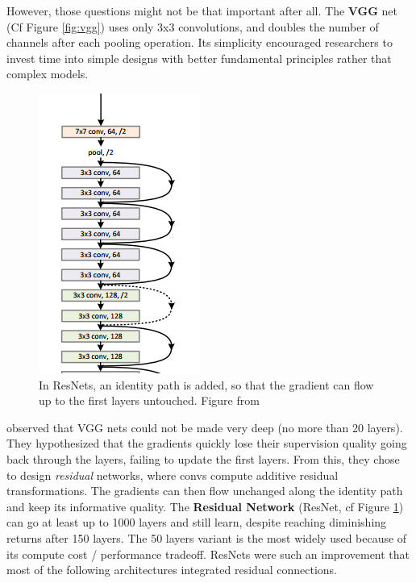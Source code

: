 However, those questions might not be that important after all. The \textbf{VGG} net  \citep{vgg} (Cf Figure \ref{fig:vgg}) uses only 3x3 convolutions, and doubles the number of channels after each pooling operation. Its simplicity encouraged researchers to invest time into simple designs with better fundamental principles rather that complex models.

\begin{figure}
    \centering
    \includegraphics{30-activity/resnet.png}
    \caption{In ResNets, an identity path is added, so that the gradient can flow up to the first layers untouched. Figure from \cite{resnet}}
    \label{fig:resnet}
\end{figure}

\citet{resnet} observed that VGG nets could not be made very deep (no more than 20 layers). They hypothesized that the gradients quickly lose their supervision quality going back through the layers, failing to update the first layers. From this, they chose to design \emph{residual} networks, where convs compute additive residual transformations. The gradients can then flow unchanged along the identity path and keep its informative quality. The \textbf{Residual Network} (ResNet, cf Figure \ref{fig:resnet}) can go at least up to 1000 layers and still learn, despite reaching diminishing returns after 150 layers. The 50 layers variant is the most widely used because of its compute cost / performance tradeoff. ResNets were such an improvement that most of the following architectures integrated residual connections.

